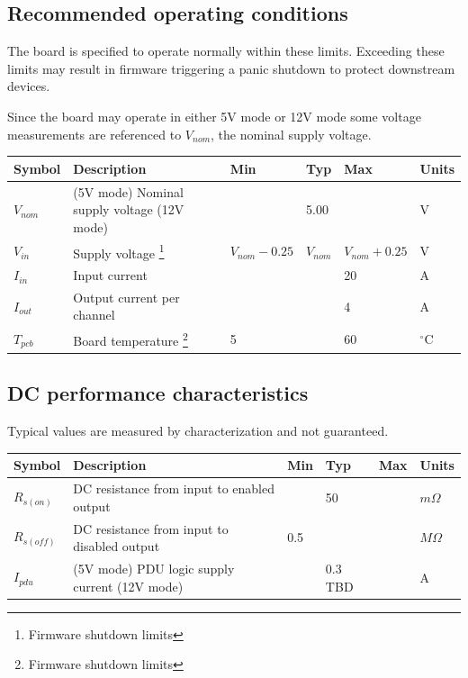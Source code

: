 \documentclass{article}
\begin{document}
\subsection{Recommended operating conditions}

The board is specified to operate normally within these limits. Exceeding these limits may result in firmware 
triggering a panic shutdown to protect downstream devices.

Since the board may operate in either 5V mode or 12V mode some voltage measurements are referenced to $V_{nom}$, the 
nominal supply voltage.

\begin{longtable}{|l|p{2in}|p{0.75in}|p{0.5in}|p{0.75in}|p{0.4in}|}
\hline
{\bf Symbol} & {\bf Description} & {\bf Min} & {\bf Typ} & {\bf Max} & {\bf Units}\\
\hline
$V_{nom}$ &
	(5V mode) Nominal supply voltage
	\newline (12V mode) &
	&
	5.00 \newline 12.00 &
	&
	V\\
\hline
$V_{in}$ &
	Supply voltage \footnote{Firmware shutdown limits} &
	$V_{nom} - 0.25$ &
	$V_{nom}$ &
	$V_{nom} + 0.25$ &
	V\\
\hline
$I_{in}$ & Input current & & & 20 & A\\
\hline
$I_{out}$ & Output current per channel & & & 4 & A\\
\hline
$T_{pcb}$ & Board temperature \footnote{Firmware shutdown limits} & 5 & & 60 & $^{\circ}$C\\
\hline
\end{longtable}

\subsection{DC performance characteristics}

Typical values are measured by characterization and not guaranteed.

\begin{longtable}{|l|p{2.5in}|p{0.5in}|p{0.5in}|p{0.5in}|p{0.5in}|}
\hline
{\bf Symbol} & {\bf Description} & {\bf Min} & {\bf Typ} & {\bf Max} & {\bf Units}\\
\hline
$R_{s(on)}$ & DC resistance from input to enabled output & & 50 & & $m\Omega$\\
\hline
$R_{s(off)}$ & DC resistance from input to disabled output & 0.5 & & & $M\Omega$\\
\hline
$I_{pdu}$ & (5V mode) PDU logic supply current \newline (12V mode) & & 0.3 \newline TBD &  & A\\
\hline
\end{longtable}
\end{document}
